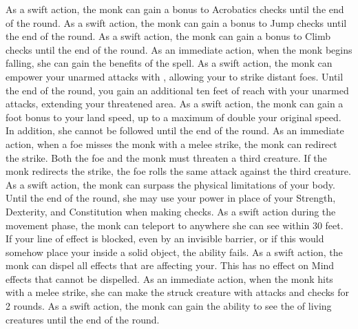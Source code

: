         As a swift action, the monk can gain a  bonus to Acrobatics checks until the end of the round.
        As a swift action, the monk can gain a  bonus to Jump checks until the end of the round.
        As a swift action, the monk can gain a  bonus to Climb checks until the end of the round.
        As an immediate action, when the monk begins falling, she can gain the benefits of the  spell.
        As a swift action, the monk can empower your unarmed attacks with \ki, allowing your to strike distant foes.
        Until the end of the round, you gain an additional ten feet of reach with your unarmed attacks, extending your threatened area.
        As a swift action, the monk can gain a  foot bonus to your land speed, up to a maximum of double your original speed.
        In addition, she cannot be followed until the end of the round.
        As an immediate action, when a foe misses the monk with a melee strike, the monk can redirect the strike.
        Both the foe and the monk must threaten a third creature.
        If the monk redirects the strike, the foe rolls the same attack against the third creature.
        As a swift action, the monk can surpass the physical limitations of your body.
        Until the end of the round, she may use your \ki power in place of your Strength, Dexterity, and Constitution when making checks.
        As a swift action during the movement phase, the monk can teleport to anywhere she can see within 30 feet.
        If your line of effect is blocked, even by an invisible barrier, or if this would somehow place your inside a solid object, the ability fails.
        As a swift action, the monk can dispel all  effects that are affecting your.
        This has no effect on Mind effects that cannot be dispelled.
        As an immediate action, when the monk hits with a melee strike, she can make the struck creature \impaired with attacks and checks for 2 rounds.
        As a swift action, the monk can gain the ability to see the \ki of living creatures until the end of the round.
